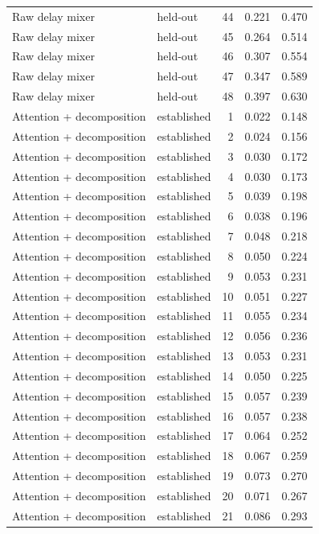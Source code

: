 \begin{tabular}{llrrr}
Raw delay mixer & held-out & 44 & 0.221 & 0.470 \\
Raw delay mixer & held-out & 45 & 0.264 & 0.514 \\
Raw delay mixer & held-out & 46 & 0.307 & 0.554 \\
Raw delay mixer & held-out & 47 & 0.347 & 0.589 \\
Raw delay mixer & held-out & 48 & 0.397 & 0.630 \\
Attention + decomposition & established & 1 & 0.022 & 0.148 \\
Attention + decomposition & established & 2 & 0.024 & 0.156 \\
Attention + decomposition & established & 3 & 0.030 & 0.172 \\
Attention + decomposition & established & 4 & 0.030 & 0.173 \\
Attention + decomposition & established & 5 & 0.039 & 0.198 \\
Attention + decomposition & established & 6 & 0.038 & 0.196 \\
Attention + decomposition & established & 7 & 0.048 & 0.218 \\
Attention + decomposition & established & 8 & 0.050 & 0.224 \\
Attention + decomposition & established & 9 & 0.053 & 0.231 \\
Attention + decomposition & established & 10 & 0.051 & 0.227 \\
Attention + decomposition & established & 11 & 0.055 & 0.234 \\
Attention + decomposition & established & 12 & 0.056 & 0.236 \\
Attention + decomposition & established & 13 & 0.053 & 0.231 \\
Attention + decomposition & established & 14 & 0.050 & 0.225 \\
Attention + decomposition & established & 15 & 0.057 & 0.239 \\
Attention + decomposition & established & 16 & 0.057 & 0.238 \\
Attention + decomposition & established & 17 & 0.064 & 0.252 \\
Attention + decomposition & established & 18 & 0.067 & 0.259 \\
Attention + decomposition & established & 19 & 0.073 & 0.270 \\
Attention + decomposition & established & 20 & 0.071 & 0.267 \\
Attention + decomposition & established & 21 & 0.086 & 0.293 \\

\end{tabular}
